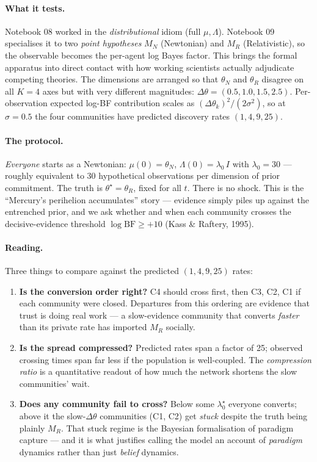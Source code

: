 \documentclass[11pt,a4paper]{article}
\theoremstyle{plain}
\begin{document}
\paragraph{What it tests.} Notebook 08 worked in the
\emph{distributional} idiom (full $\mu,\Lambda$). Notebook 09 specialises
it to two \emph{point hypotheses} $M_N$ (Newtonian) and $M_R$
(Relativistic), so the observable becomes the per-agent log Bayes
factor. This brings the formal apparatus into direct contact with how
working scientists actually adjudicate competing theories. The
dimensions are arranged so that $\theta_N$ and $\theta_R$ disagree on
all $K=4$ axes but with very different magnitudes:
$\Delta\theta=(0.5, 1.0, 1.5, 2.5)$. Per-observation expected log-BF
contribution scales as $(\Delta\theta_k)^2/(2\sigma^2)$, so at
$\sigma=0.5$ the four communities have predicted discovery rates
$(1, 4, 9, 25)$.

\paragraph{The protocol.} \emph{Everyone} starts as a Newtonian:
$\mu(0)=\theta_N$, $\Lambda(0)=\lambda_0\,I$ with $\lambda_0=30$ ---
roughly equivalent to 30 hypothetical observations per dimension of
prior commitment. The truth is $\theta^\star=\theta_R$, fixed for all
$t$. There is no shock. This is the ``Mercury's perihelion accumulates''
story --- evidence simply piles up against the entrenched prior, and we
ask whether and when each community crosses the decisive-evidence
threshold $\log\mathrm{BF}\geq+10$ (Kass \& Raftery, 1995).

\paragraph{Reading.} Three things to compare against the predicted
$(1,4,9,25)$ rates:
\begin{enumerate}\itemsep1pt
\item \textbf{Is the conversion order right?} C4 should cross first,
then C3, C2, C1 if each community were closed. Departures from this
ordering are evidence that trust is doing real work --- a slow-evidence
community that converts \emph{faster} than its private rate has
imported $M_R$ socially.
\item \textbf{Is the spread compressed?} Predicted rates span a factor
of 25; observed crossing times span far less if the population is
well-coupled. The \emph{compression ratio} is a quantitative readout of
how much the network shortens the slow communities' wait.
\item \textbf{Does any community fail to cross?} Below some
$\lambda_0^\star$ everyone converts; above it the slow-$\Delta\theta$
communities (C1, C2) get \emph{stuck} despite the truth being plainly
$M_R$. That stuck regime is the Bayesian formalisation of paradigm
capture --- and it is what justifies calling the model an account of
\emph{paradigm} dynamics rather than just \emph{belief} dynamics.
\end{enumerate}
\end{document}
